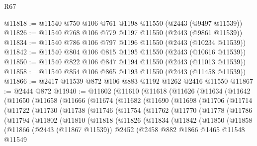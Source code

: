 \begin{lexlean}{R67}
\begin{coremodule}
@11818 := @11540 @750 @106 @761 @1198 @11550 (@2443 (@9497 @11539))
@11826 := @11540 @768 @106 @779 @1197 @11550 (@2443 (@9861 @11539))
@11834 := @11540 @786 @106 @797 @1196 @11550 (@2443 (@10234 @11539))
@11842 := @11540 @804 @106 @815 @1195 @11550 (@2443 (@10616 @11539))
@11850 := @11540 @822 @106 @847 @1194 @11550 (@2443 (@11013 @11539))
@11858 := @11540 @854 @106 @865 @1193 @11550 (@2443 (@11458 @11539))
@11866 := @2417 @11539 @872 @106 @883 @1192 @1262 @2416 @11550
@11867 := @2444 @872
@11940 := @11602
    (@11610
      (@11618
        (@11626
          (@11634
            (@11642
              (@11650
                (@11658
                  (@11666
                    (@11674
                      (@11682
                        (@11690
                          (@11698
                            (@11706
                              (@11714
                                (@11722
                                  (@11730
                                    (@11738
                                      (@11746
                                        (@11754
                                          (@11762
                                            (@11770
                                              (@11778
                                                (@11786
                                                  (@11794
                                                    (@11802
                                                      (@11810
                                                        (@11818
                                                          (@11826
                                                            (@11834
                                                              (@11842
                                                                (@11850
                                                                  (@11858
                                                                    (@11866
                                                                      (@2443 (@11867 @11539))
                                                                      @2452
                                                                      (@2458
                                                                        @882
                                                                        @1866
                                                                        @1465
                                                                        @11548
                                                                        @11549

\end{coremodule}
\end{lexlean}
